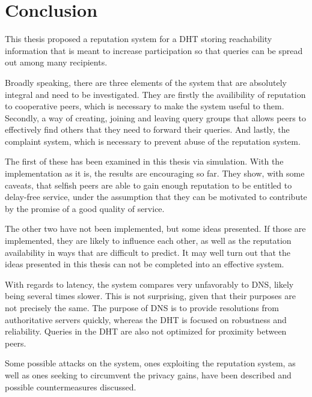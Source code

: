 \chapter{Conclusion}
\label{chap:conclusion}
This thesis proposed a reputation system for a DHT storing reachability
information that is meant to increase participation so that queries can be
spread out among many recipients.

Broadly speaking, there are three elements of the system that are absolutely
integral and need to be investigated. They are firstly the availibility of
reputation to cooperative peers, which is necessary to make the system useful to
them. Secondly, a way of creating, joining and leaving query groups that allows
peers to effectively find others that they need to forward their queries. And
lastly, the complaint system, which is necessary to prevent abuse of the
reputation system.

The first of these has been examined in this thesis via simulation. With the
implementation as it is, the results are encouraging so far. They show, with
some caveats, that selfish peers are able to gain enough reputation to be
entitled to delay-free service, under the assumption that they can be motivated
to contribute by the promise of a good quality of service.

The other two have not been implemented, but some ideas presented. If those are
implemented, they are likely to influence each other, as well as the reputation
availability in ways that are difficult to predict. It may well turn out that
the ideas presented in this thesis can not be completed into an effective
system.

With regards to latency, the system compares very unfavorably to DNS, likely
being several times slower. This is not surprising, given that their purposes
are not precisely the same. The purpose of DNS is to provide resolutions from
authoritative servers quickly, whereas the DHT is focused on robustness and
reliability. Queries in the DHT are also not optimized for proximity between
peers.

Some possible attacks on the system, ones exploiting the reputation system, as
well as ones seeking to circumvent the privacy gains, have been described and
possible countermeasures discussed.
